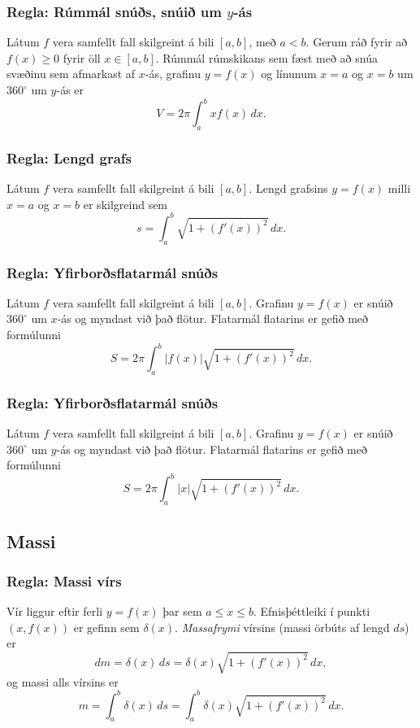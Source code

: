 \documentclass[icelandic,a4paper,12pt]{article}
\begin{document}
\subsubsection{Regla: Rúmmál snúðs, snúið um $y$-ás} 
Látum $f$ vera samfellt fall skilgreint á bili $[a, b]$, með $a<b$.
Gerum ráð fyrir að $f(x)\geq 0$ fyrir öll $x\in [a, b]$.  Rúmmál
rúmskikans sem fæst með að snúa svæðinu sem afmarkast af  $x$-ás,
grafinu $y=f(x)$ og línunum $x=a$ og $x=b$ um $360^\circ$ um $y$-ás er
$$V=2\pi\int_a^b xf(x)\,dx.$$

\subsubsection{Regla: Lengd grafs} 
Látum $f$ vera samfellt fall skilgreint á bili $[a, b]$.  Lengd
grafsins $y=f(x)$ milli $x=a$ og $x=b$ er skilgreind sem 
$$s=\int_a^b\sqrt{1+(f'(x))^2}\,dx.$$

\subsubsection{Regla: Yfirborðsflatarmál snúðs} 
Látum $f$ vera samfellt fall skilgreint á bili $[a, b]$.  Grafinu
$y=f(x)$ er snúið   $360^\circ$ um $x$-ás og myndast við það flötur.
Flatarmál flatarins er gefið með formúlunni
$$S=2\pi\int_a^b|f(x)|\sqrt{1+(f'(x))^2}\,dx.$$

\subsubsection{Regla: Yfirborðsflatarmál snúðs} 
Látum $f$ vera samfellt fall skilgreint á bili $[a, b]$.  Grafinu
$y=f(x)$ er snúið   $360^\circ$ um $y$-ás og myndast við það flötur.
Flatarmál flatarins er gefið með formúlunni
$$S=2\pi\int_a^b|x|\sqrt{1+(f'(x))^2}\,dx.$$


\subsection{Massi}
\subsubsection{Regla: Massi vírs}  
Vír liggur eftir ferli $y=f(x)$ þar sem $a\leq x\leq b$. 
Efnisþéttleiki í punkti $(x, f(x))$ er gefinn sem $\delta(x)$.
\emph{Massafrymi} vírsins (massi örbúts af lengd $ds$) er
$$dm 
= \delta(x)\, ds 
=\delta(x)\sqrt{1+(f'(x))^2}\, dx,$$
og massi alls vírsins er
$$m=\int_a^b \delta(x)\,ds=\int_a^b \delta(x)\sqrt{1+(f'(x))^2}\, dx.$$
\end{document}
